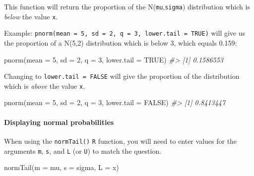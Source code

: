 \documentclass[
]{report}
\newenvironment{Shaded}{\begin{snugshade}}{\end{snugshade}}
\newcommand{\AttributeTok}[1]{\textcolor[rgb]{0.77,0.63,0.00}{#1}}
\newcommand{\CommentTok}[1]{\textcolor[rgb]{0.56,0.35,0.01}{\textit{#1}}}
\newcommand{\ConstantTok}[1]{\textcolor[rgb]{0.00,0.00,0.00}{#1}}
\newcommand{\DecValTok}[1]{\textcolor[rgb]{0.00,0.00,0.81}{#1}}
\newcommand{\FunctionTok}[1]{\textcolor[rgb]{0.00,0.00,0.00}{#1}}
\newcommand{\NormalTok}[1]{#1}
\begin{document}
This function will return the proportion of the N(\texttt{mu},\texttt{sigma}) distribution which is \emph{below} the value \texttt{x}.

Example: \texttt{pnorm(mean\ =\ 5,\ sd\ =\ 2,\ q\ =\ 3,\ lower.tail\ =\ TRUE)} will give us the proportion of a N(5,2) distribution which is below 3, which equals 0.159:

\begin{Shaded}
\begin{Highlighting}[]
\FunctionTok{pnorm}\NormalTok{(}\AttributeTok{mean =} \DecValTok{5}\NormalTok{, }\AttributeTok{sd =} \DecValTok{2}\NormalTok{, }\AttributeTok{q =} \DecValTok{3}\NormalTok{, }\AttributeTok{lower.tail =} \ConstantTok{TRUE}\NormalTok{)}
\CommentTok{\#\textgreater{} [1] 0.1586553}
\end{Highlighting}
\end{Shaded}

\newpage

Changing to \texttt{lower.tail\ =\ FALSE} will give the proportion of the distribution which is \emph{above} the value \texttt{x}.

\begin{Shaded}
\begin{Highlighting}[]
\FunctionTok{pnorm}\NormalTok{(}\AttributeTok{mean =} \DecValTok{5}\NormalTok{, }\AttributeTok{sd =} \DecValTok{2}\NormalTok{, }\AttributeTok{q =} \DecValTok{3}\NormalTok{, }\AttributeTok{lower.tail =} \ConstantTok{FALSE}\NormalTok{)}
\CommentTok{\#\textgreater{} [1] 0.8413447}
\end{Highlighting}
\end{Shaded}

\hypertarget{displaying-normal-probabilities}{%
\paragraph*{Displaying normal probabilities}\label{displaying-normal-probabilities}}

When using the \texttt{normTail()} \texttt{R} function, you will need to enter values for the arguments \texttt{m}, \texttt{s}, and \texttt{L} (or \texttt{U}) to match the question.

\begin{Shaded}
\begin{Highlighting}[]
\FunctionTok{normTail}\NormalTok{(}\AttributeTok{m =}\NormalTok{ mu, }\AttributeTok{s =}\NormalTok{ sigma, }\AttributeTok{L =}\NormalTok{ x)}
\end{Highlighting}
\end{Shaded}
\end{document}
